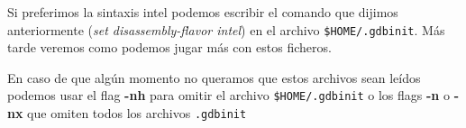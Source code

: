 Si preferimos la sintaxis intel podemos escribir el comando que dijimos anteriormente (\emph{set disassembly-flavor intel}) en el archivo \texttt{\$HOME/.gdbinit}. Más tarde veremos como podemos jugar más con estos ficheros.

En caso de que algún momento no queramos que estos archivos sean leídos podemos usar el flag \textbf{-nh} para omitir el archivo \texttt{\$HOME/.gdbinit} o los flags \textbf{-n} o \textbf{-nx} que omiten todos los archivos \texttt{.gdbinit}


